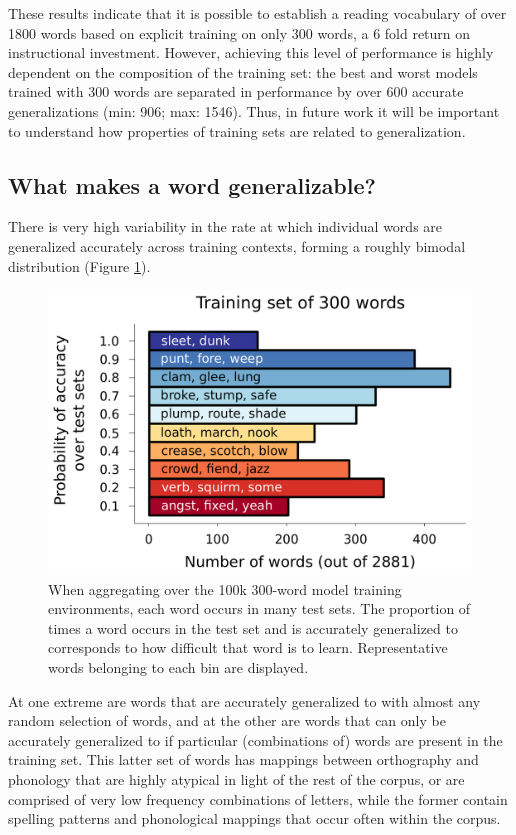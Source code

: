 \documentclass[10pt,letterpaper]{article}
\begin{document}
These results indicate that it is possible to establish a reading vocabulary of over 1800 words based on explicit training on only 300 words, a 6 fold return on instructional investment. However, achieving this level of performance is highly dependent on the composition of the training set: the best and worst models trained with 300 words are separated in performance by over 600 accurate generalizations (min: 906; max: 1546). Thus, in future work it will be important to understand how properties of training sets are related to generalization.   

\subsection{What makes a word generalizable?}
There is very high variability in the rate at which individual words are generalized accurately across training contexts, forming a roughly bimodal distribution (Figure \ref{word_acc_hist}).

\begin{figure}[t]
	\includegraphics[width=0.9\columnwidth]{figures/word_accuracy_over_testsets.png}

	\caption{When aggregating over the 100k 300-word model training environments, each word occurs in many test sets. The proportion of times a word occurs in the test set and is accurately generalized to corresponds to how difficult that word is to learn. Representative words belonging to each bin are displayed.}
	\label{word_acc_hist}
\end{figure}

At one extreme are words that are accurately generalized to with almost any random selection of words, and at the other are words that can only be accurately generalized to if particular (combinations of) words are present in the training set. This latter set of words has mappings between orthography and phonology that are highly atypical in light of the rest of the corpus, or are comprised of very low frequency combinations of letters, while the former contain spelling patterns and phonological mappings that occur often within the corpus.
\end{document}
